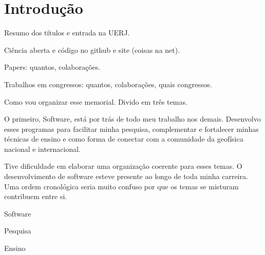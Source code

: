 \section{Introdução}

Resumo dos títulos e entrada na UERJ.

Ciência aberta e código no github e site (coisas na net).

Papers: quantos, colaborações.

Trabalhos em congressos: quantos, colaborações, quais congressos.

Como vou organizar esse memorial.
Divido em três temas.

O primeiro, Software, está por trás de todo meu trabalho nos demais.
Desenvolvo esses programas para facilitar minha pesquisa, complementar e
fortalecer minhas técnicas de ensino e como forma de conectar com a comunidade
da geofísica nacional e internacional.

Tive dificuldade em elaborar uma organização coerente para esses temas.
O desenvolvimento de software esteve presente ao longo de toda minha carreira.
Uma ordem cronológica seria muito confuso por que os temas se misturam contribuem entre si.

Software

Pesquisa

Ensino


\lipsum[1-10]
